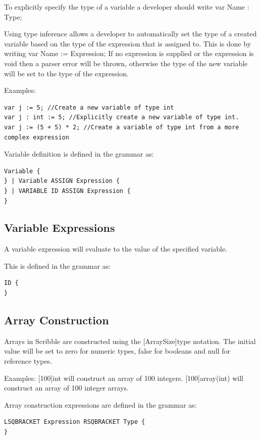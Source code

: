\documentclass[]{final_report}
\begin{document}
To explicitly specify the type of a variable a developer should write var Name : Type;

Using type inference allows a developer to automatically set the type of a created variable based on the type of the expression that is assigned to. This is done by writing var Name := Expression; If no expression is supplied or the expression is void then a parser error will be thrown, otherwise the type of the new variable will be set to the type of the expression.

Examples:
\begin{verbatim}
var j := 5; //Create a new variable of type int
var j : int := 5; //Explicitly create a new variable of type int.
var j := (5 + 5) * 2; //Create a variable of type int from a more complex expression
\end{verbatim}

Variable definition is defined in the grammar as:
\begin{verbatim}
Variable {
} | Variable ASSIGN Expression {
} | VARIABLE ID ASSIGN Expression {
}
\end{verbatim}

\subsection{Variable Expressions}

A variable expression will evaluate to the value of the specified variable.

This is defined in the grammar as: \begin{verbatim}
ID {
}
\end{verbatim}

\subsection{Array Construction}

Arrays in Scribble are constructed using the [ArraySize]type notation. The initial value will be set to zero for numeric types, false for booleans and null for reference types.

Examples:
[100]int will construct an array of 100 integers.
[100]array(int) will construct an array of 100 integer arrays.

Array construction expressions are defined in the grammar as:
\begin{verbatim}
LSQBRACKET Expression RSQBRACKET Type {
}
\end{verbatim}
\end{document}
